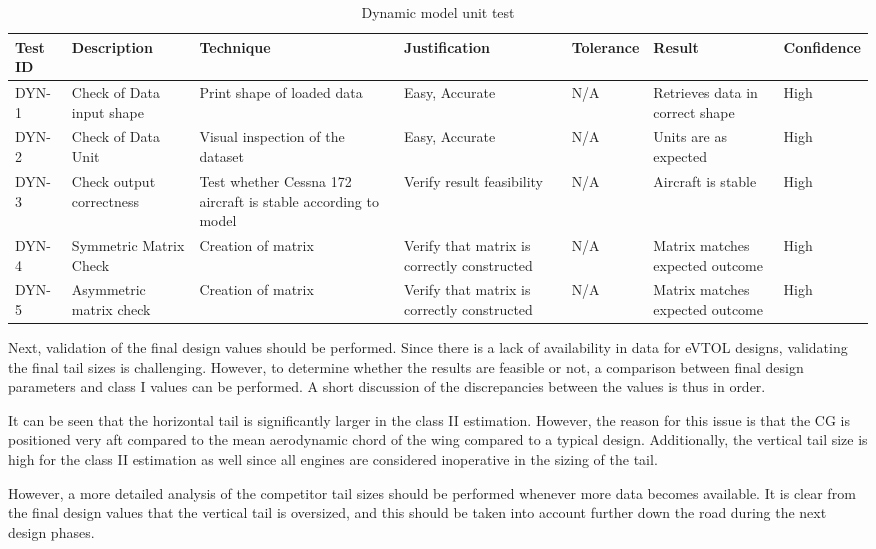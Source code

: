 \begin{table}[H]
\centering
\caption{Dynamic model unit test}
\label{tab:unit_tests_module_1}
\begin{tabular}{p{1.5cm} p{2.2cm} p{2.5cm} p{2cm} p{2cm} p{2cm} p{1.5cm}}
\toprule
Test ID & Description  & Technique & Justification & Tolerance & Result & Confidence \\ \midrule
DYN-1   & \raggedright Check of Data input shape  & Print shape of loaded data  & Easy, Accurate       & N/A       & \raggedright Retrieves data in correct shape & High
\\
DYN-2 & \raggedright Check of Data Unit  & \raggedright Visual inspection of the dataset  & Easy, Accurate       & N/A       & \raggedright Units are as expected & High
\\
DYN-3 & \raggedright Check output correctness  & \raggedright Test whether Cessna 172 aircraft is stable according to model  & Verify result feasibility       & N/A       & \raggedright Aircraft is stable & High \\
DYN-4 &\raggedright Symmetric Matrix Check & \raggedright Creation of matrix & \raggedright Verify that matrix is correctly constructed   &  N/A       & \raggedright Matrix matches expected outcome & High
\\
DYN-5   & \raggedright Asymmetric matrix check  & Creation of matrix & \raggedright Verify that matrix is correctly constructed  &  N/A      & \raggedright Matrix matches expected outcome & High\\
\bottomrule
\end{tabular}
\end{table}

Next, validation of the final design values should be performed.
Since there is a lack of availability in data for eVTOL designs, validating the final tail sizes is challenging.
However, to determine whether the results are feasible or not, a comparison between final design parameters and class I values can be performed.
A short discussion of the discrepancies between the values is thus in order.

It can be seen that the horizontal tail is significantly larger in the class II estimation.
However, the reason for this issue is that the CG is positioned very aft compared to the mean aerodynamic chord of the wing compared to a typical design.
Additionally, the vertical tail size is high for the class II estimation as well since all engines are considered inoperative in the sizing of the tail.

However, a more detailed analysis of the competitor tail sizes should be performed whenever more data becomes available.
It is clear from the final design values that the vertical tail is oversized, and this should be taken into account further down the road during the next design phases.

